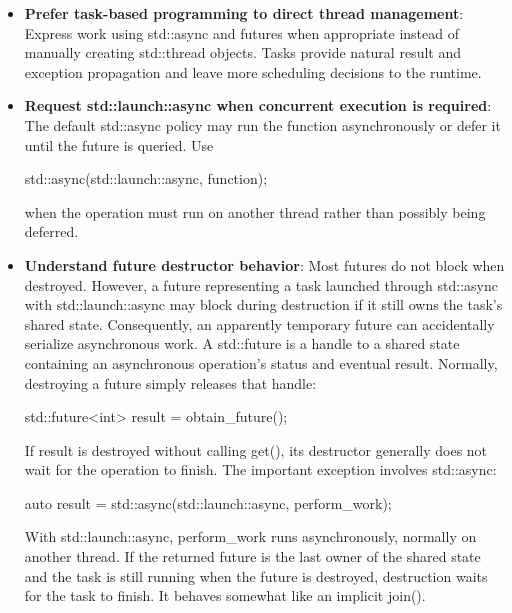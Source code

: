 \documentclass{report}
\begin{document}
\begin{itemize}
            \bigbreak \noindent 
            \begin{cppcode}
                auto call = [](auto&& value) {
                    process(std::forward<decltype(value)>(value));
                };
            \end{cppcode}
        \item \textbf{Prefer task-based programming to direct thread management}: Express work using std::async and futures when appropriate instead of manually creating std::thread objects. Tasks provide natural result and exception propagation and leave more scheduling decisions to the runtime.
        \item \textbf{Request std::launch::async when concurrent execution is required}: The default std::async policy may run the function asynchronously or defer it until the future is queried. Use
            \bigbreak \noindent 
            \begin{cppcode}
            std::async(std::launch::async, function);
            \end{cppcode}
            \bigbreak \noindent 
            when the operation must run on another thread rather than possibly being deferred.
        \item \textbf{Understand future destructor behavior}: Most futures do not block when destroyed. However, a future representing a task launched through std::async with std::launch::async may block during destruction if it still owns the task’s shared state. Consequently, an apparently temporary future can accidentally serialize asynchronous work.
            \bigbreak \noindent 
            A std::future is a handle to a shared state containing an asynchronous operation’s status and eventual result. Normally, destroying a future simply releases that handle:
            \bigbreak \noindent 
            \begin{cppcode}
            std::future<int> result = obtain_future();
            \end{cppcode}
            \bigbreak \noindent 
            If result is destroyed without calling get(), its destructor generally does not wait for the operation to finish.
            \bigbreak \noindent 
            The important exception involves std::async:
            \bigbreak \noindent 
            \begin{cppcode}
            auto result = std::async(std::launch::async, perform_work);
            \end{cppcode}
            \bigbreak \noindent 
            With std::launch::async, perform\_work runs asynchronously, normally on another thread. If the returned future is the last owner of the shared state and the task is still running when the future is destroyed, destruction waits for the task to finish. It behaves somewhat like an implicit join().

\end{itemize}
\end{document}
